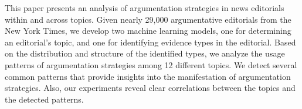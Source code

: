 This paper presents an analysis of argumentation strategies in news editorials within and across topics. Given nearly 29,000 argumentative editorials from the New York Times, we develop two machine learning models, one for determining an editorial's topic, and one for identifying evidence types in the editorial. Based on the distribution and structure of the identified types, we analyze the usage patterns of argumentation strategies among 12 different topics. We detect several common patterns that provide insights into the manifestation of argumentation strategies. Also, our experiments reveal clear correlations between the topics and the detected patterns.
